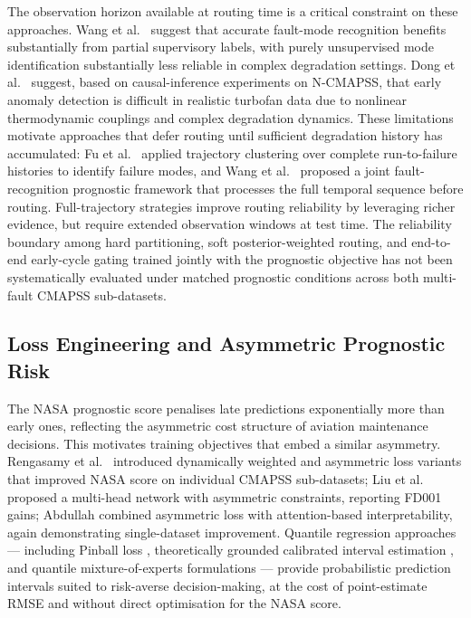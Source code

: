 \documentclass[preprint,10pt]{elsarticle}
\begin{document}
The observation horizon available at routing time is a critical constraint on these approaches. Wang et al.\ \cite{ref49} suggest that accurate fault-mode recognition benefits substantially from partial supervisory labels, with purely unsupervised mode identification substantially less reliable in complex degradation settings. Dong et al.\ \cite{ref48} suggest, based on causal-inference experiments on N-CMAPSS, that early anomaly detection is difficult in realistic turbofan data due to nonlinear thermodynamic couplings and complex degradation dynamics. These limitations motivate approaches that defer routing until sufficient degradation history has accumulated: Fu et al.\ \cite{ref46} applied trajectory clustering over complete run-to-failure histories to identify failure modes, and Wang et al.\ \cite{ref47} proposed a joint fault-recognition prognostic framework that processes the full temporal sequence before routing. Full-trajectory strategies improve routing reliability by leveraging richer evidence, but require extended observation windows at test time. The reliability boundary among hard partitioning, soft posterior-weighted routing, and end-to-end early-cycle gating trained jointly with the prognostic objective has not been systematically evaluated under matched prognostic conditions across both multi-fault CMAPSS sub-datasets.

\subsection{Loss Engineering and Asymmetric Prognostic Risk}

The NASA prognostic score penalises late predictions exponentially more than early ones, reflecting the asymmetric cost structure of aviation maintenance decisions. This motivates training objectives that embed a similar asymmetry. Rengasamy et al.\ \cite{ref37,ref38} introduced dynamically weighted and asymmetric loss variants that improved NASA score on individual CMAPSS sub-datasets; Liu et al.\ \cite{ref39} proposed a multi-head network with asymmetric constraints, reporting FD001 gains; Abdullah \cite{ref22} combined asymmetric loss with attention-based interpretability, again demonstrating single-dataset improvement. Quantile regression approaches --- including Pinball loss \cite{ref40}, theoretically grounded calibrated interval estimation \cite{ref41}, and quantile mixture-of-experts formulations \cite{ref43} --- provide probabilistic prediction intervals suited to risk-averse decision-making, at the cost of point-estimate RMSE and without direct optimisation for the NASA score.
\end{document}
